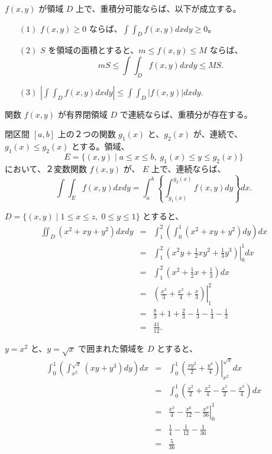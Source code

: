 \begin{prop} \label{prop:intint:bound}
$f(x,y)$ が領域 $D$ 上で、重積分可能ならば、以下が成立する。
\begin{itemize}
\item[$(1)$] $f(x,y)\geq 0$ ならば、${\displaystyle \int\!\!\!\int_Df(x,y)dxdy\geq 0}$。
\item[$(2)$] $S$ を領域の面積とすると、$m\leq f(x,y)\leq M$ ならば、
$$mS \leq \int\!\!\!\int_D f(x,y)dxdy \leq MS.$$
\item[$(3)$] ${\displaystyle \left|\int\!\!\!\int_Df(x,y)dxdy\right|\leq \int\!\!\!\int_D|f(x,y)|dxdy}$.
\end{itemize}
\end{prop}

\begin{thm} \label{thm:intint:existence}
関数 $f(x,y)$ が有界閉領域 $D$ で連続ならば、重積分が存在する。
\end{thm}

\begin{thm} \label{thm:doubleint}
閉区間 $[a,b]$ 上の２つの関数 $g_1(x)$ と、$g_2(x)$ が、連続で、$g_1(x)\leq g_2(x)$ とする。領域、
$$E = \{(x,y)\mid a\leq x\leq b,\;g_1(x)\leq y\leq g_2(x)\}$$
において、２変数関数 $f(x,y)$ が、 $E$ 上で、連続ならば、
$$\int\!\!\!\int_E f(x,y)dxdy = \int_a^b\left\{\int_{g_1(x)}^{g_2(x)}f(x,y)dy\right\}dx.$$
\end{thm}

\begin{eg}
$D = \{(x,y)\mid 1\leq x\leq z,\;0\leq y\leq 1\}$ とすると、
\begin{eqnarray*}
\iint_D(x^2 + xy + y^2)dxdy & = & \int_1^2\left(\int_0^1 (x^2+xy+y^2)dy\right)dx\\
& = & \left.\int_1^2(x^2y + \frac{1}{2}xy^2 + \frac{1}{3}y^3)\right|^1_0dx\\
& = & \int^2_1(x^2 + \frac12x + \frac13)dx\\
& = & \left.\left(\frac{x^3}{3} + \frac{x^2}{4} + \frac{x}{3}\right)\right|^2_1\\
& = & \frac83 + 1 + \frac23 - \frac13 -\frac14 - \frac13\\
& = & \frac{41}{12}.
\end{eqnarray*}
\end{eg}

\begin{eg}
$y = x^2$ と、$y = \sqrt{x}$  で囲まれた領域を $D$ とすると、
\begin{eqnarray*}
\int^1_0\left(\int_{x^2}^{\sqrt{x}}(xy+y^3)dy\right)dx & = & \int^1_0\left.\left(\frac{xy^2}2 + \frac{y^4}4\right)\right|^{\sqrt{x}}_{x^2}dx\\
& = & \int^1_0\left(\frac{x^2}{2} + \frac{x^2}{4} - \frac{x^5}{2} - \frac{x^8}{4}\right)dx\\
& = & \left.\frac{x^3}4 - \frac{x^6}{12} - \frac{x^9}{36}\right|^1_0\\
& = & \frac14 - \frac1{12} - \frac1{36}\\
& = & \frac{5}{36}
\end{eqnarray*}
\end{eg}

